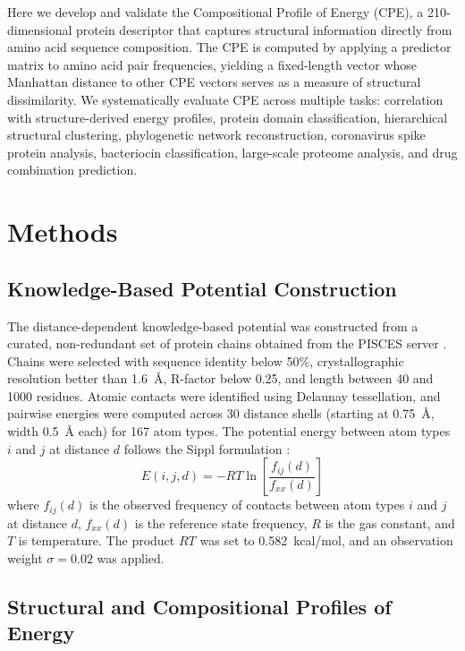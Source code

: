 \documentclass[11pt]{article}
\begin{document}
Here we develop and validate the Compositional Profile of Energy (CPE), a 210-dimensional protein descriptor that captures structural information directly from amino acid sequence composition. The CPE is computed by applying a predictor matrix to amino acid pair frequencies, yielding a fixed-length vector whose Manhattan distance to other CPE vectors serves as a measure of structural dissimilarity. We systematically evaluate CPE across multiple tasks: correlation with structure-derived energy profiles, protein domain classification, hierarchical structural clustering, phylogenetic network reconstruction, coronavirus spike protein analysis, bacteriocin classification, large-scale proteome analysis, and drug combination prediction.

\section{Methods}

\subsection{Knowledge-Based Potential Construction}

The distance-dependent knowledge-based potential was constructed from a curated, non-redundant set of protein chains obtained from the PISCES server \citep{wang2000}. Chains were selected with sequence identity below 50\%, crystallographic resolution better than 1.6~\AA, R-factor below 0.25, and length between 40 and 1000 residues. Atomic contacts were identified using Delaunay tessellation, and pairwise energies were computed across 30 distance shells (starting at 0.75~\AA, width 0.5~\AA{} each) for 167 atom types. The potential energy between atom types $i$ and $j$ at distance $d$ follows the Sippl formulation \citep{sippl1990}:
\begin{equation}
E(i,j,d) = -RT \ln\left[\frac{f_{ij}(d)}{f_{xx}(d)}\right]
\end{equation}
where $f_{ij}(d)$ is the observed frequency of contacts between atom types $i$ and $j$ at distance $d$, $f_{xx}(d)$ is the reference state frequency, $R$ is the gas constant, and $T$ is temperature. The product $RT$ was set to 0.582~kcal/mol, and an observation weight $\sigma = 0.02$ was applied.

\subsection{Structural and Compositional Profiles of Energy}
\end{document}
